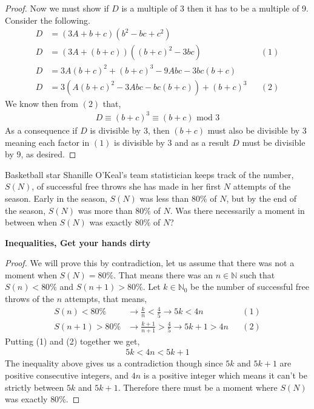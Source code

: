 \documentclass[11pt]{article}
\newenvironment{problem}[2][Problem\!]{\begin{trivlist}
\item[\hskip \labelsep {\bfseries #1}\hskip \labelsep {\bfseries #2}]}{\end{trivlist}}
\newcommand{\nn}{\mathbb N}   %
\begin{document}
\begin{proof}
    Now we must show if $D$ is a multiple of $3$ then it has to be a multiple of 9. Consider the following. 
    \begin{align*}
        D &= (3A + b + c)(b^{2} - bc + c^{2}) \\
        D &= (3A + (b + c))((b+c)^{2}-3bc) && (1) \\
        D &= 3A(b+c)^{2} + (b+c)^{3} -9Abc -3bc(b+c) \\
        D &= 3(A(b+c)^{2} -3Abc -bc(b+c)) + (b+c)^{3} && (2)
     \end{align*}
     We know then from $(2)$ that,
     \begin{align*}
         D \equiv (b+c)^{3} \equiv (b+c) \text{ mod } 3
     \end{align*}
     As a consequence if $D$ is divisible by 3, then $(b+c)$ must also be divisible by 3 meaning each factor in $(1)$ is divisible by 3 and as a result $D$ must be divisible by 9, as desired.
\end{proof}

\begin{tcolorbox}
    \begin{problem} {IC | 12/01 | PP 36}
        Basketball star Shanille O'Keal's team statistician keeps track of the number, $S(N)$, of successful free throws she has made in her first $N$ attempts of the season. Early in the season, $S(N)$ was less than $80\%$ of $N$, but by the end of the season, $S(N)$ was more than $80\%$ of $N$. Was there necessarily a moment in between when $S(N)$ was exactly $80\%$ of $N$?
    \end{problem}
    \textbf{Inequalities, Get your hands dirty}
\end{tcolorbox}
\begin{proof}
    We will prove this by contradiction, let us assume that there was not a moment when $S(N) = 80\%$. That means there was an $n \in \nn$ such that $S(n) < 80\%$ and $S(n +1) > 80\%$. Let $k\in \nn_0$ be the number of successful free throws of the $n$ attempts, that means,
    \begin{align*}
        S(n) < 80\% &\rightarrow \frac{k}{n} < \frac{4}{5} \rightarrow 5k < 4n &&(1)\\
        S(n+1) > 80\% &\rightarrow \frac{k+1}{n+1} > \frac{4}{5} \rightarrow  5k +1 > 4n && (2) 
    \end{align*}
    Putting (1) and (2) together we get,
    \begin{align*}
        5k < 4n < 5k+1
    \end{align*}
    The inequality above gives us a contradiction though since $5k$ and $5k+1$ are positive consecutive integers, and $4n$ is a positive integer which means it can't be strictly between $5k$ and $5k +1$. Therefore there must be a moment where $S(N)$ was exactly $80 \%$.
\end{proof}
\end{document}
